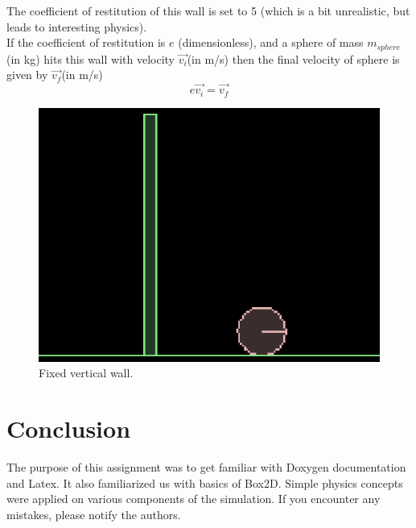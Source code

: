 \documentclass[11pt,english]{article}
\begin{document}
\indent The coefficient of restitution of this wall is set to 5 (which is a bit unrealistic, but leads to interesting physics). 
\\ \indent If the coefficient of restitution\cite{hcv} is $e$ (dimensionless), and a sphere of mass $m_{sphere}$(in kg) hits this wall with velocity $\vec{v_{i}}$(in m/s) then the final velocity of sphere is given by\cite{rh} $\vec{v_{f}}$(in m/s) 
\begin{equation}
e\vec{v_{i}} = \vec{v_{f}}
\end{equation}
\begin{figure}[h!]
\centering
\includegraphics[scale=1.1]{verticalwall}
\caption{Fixed vertical wall.} 
\end{figure}

\section{Conclusion}
\indent The purpose of this assignment was to get familiar with Doxygen documentation and Latex. It also familiarized us with basics of Box2D. Simple physics concepts were applied on various components of the simulation. If you encounter any mistakes, please notify the authors.


\end{document}
